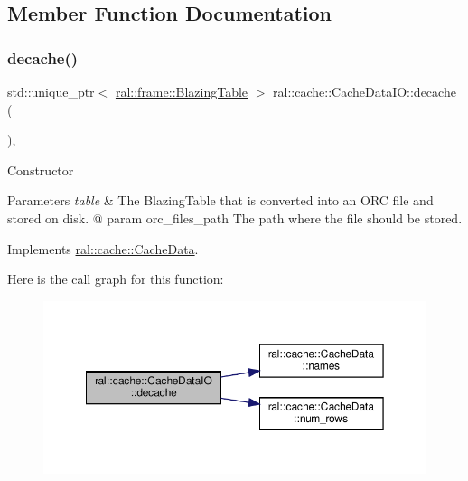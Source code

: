 \subsection{Member Function Documentation}
\mbox{\label{classral_1_1cache_1_1CacheDataIO_a7fb2dceef20a385e31508ac70edfbf58}} 
\subsubsection{\texorpdfstring{decache()}{decache()}}
{\footnotesize\ttfamily std\+::unique\+\_\+ptr$<$ \hyperlink{classral_1_1frame_1_1BlazingTable}{ral\+::frame\+::\+Blazing\+Table} $>$ ral\+::cache\+::\+Cache\+Data\+I\+O\+::decache (\begin{DoxyParamCaption}{ }\end{DoxyParamCaption})\hspace{0.3cm}{\ttfamily [override]}, {\ttfamily [virtual]}}

Constructor 
\begin{DoxyParams}{Parameters}
{\em table} & The Blazing\+Table that is converted into an O\+RC file and stored on disk. @ param orc\+\_\+files\+\_\+path The path where the file should be stored. \\
\hline
\end{DoxyParams}


Implements \hyperlink{classral_1_1cache_1_1CacheData_a2db8fdd2151babd7a07f4c6e246b710c}{ral\+::cache\+::\+Cache\+Data}.

Here is the call graph for this function\+:\nopagebreak
\begin{figure}[H]
\begin{center}
\leavevmode
\includegraphics[width=350pt]{classral_1_1cache_1_1CacheDataIO_a7fb2dceef20a385e31508ac70edfbf58_cgraph}
\end{center}
\end{figure}
\mbox{\label{classral_1_1cache_1_1CacheDataIO_a9f5ae6134a546813c74a2924f7567080}} 
